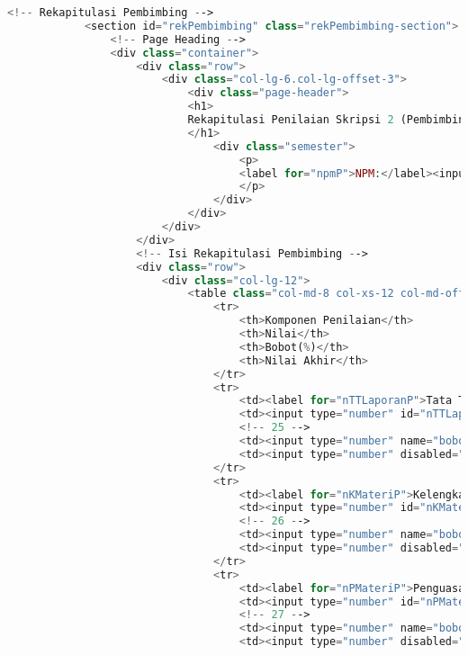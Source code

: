 \begin{lstlisting}[language=PHP,basicstyle=\tiny,caption=skripsi.php]
			<!-- Rekapitulasi Pembimbing -->
			<section id="rekPembimbing" class="rekPembimbing-section">
				<!-- Page Heading -->
				<div class="container">
					<div class="row">
						<div class="col-lg-6.col-lg-offset-3">
							<div class="page-header">
							<h1>
							Rekapitulasi Penilaian Skripsi 2 (Pembimbing)
							</h1>
								<div class="semester">
									<p> 
									<label for="npmP">NPM:</label><input id="nmpP" maxlength="10" value="{{ n_npm}}" disabled="disabled" />
									</p>
								</div>
							</div>
						</div>
					</div>
					<!-- Isi Rekapitulasi Pembimbing -->
					<div class="row">
						<div class="col-lg-12">
							<table class="col-md-8 col-xs-12 col-md-offset-4 col-md-pull-2 table-responsive">
								<tr>
									<th>Komponen Penilaian</th>
									<th>Nilai</th>
									<th>Bobot(%)</th>
									<th>Nilai Akhir</th>
								</tr>
								<tr>
									<td><label for="nTTLaporanP">Tata Tulis Laporan</label></td>
									<td><input type="number" id="nTTLaporanP" max="100" ng-model="nilai_TTLaporanP" class="form-nilai"/></td>
									<!-- 25 -->
									<td><input type="number" name="bobotTataTulisLaporanPembimbing" ng-model="TTLaporanP.value" ng-init="TTLaporanP.value = 20" min="0" max="100" class="form-nilai" readonly="readonly" /></td>
									<td><input type="number" disabled="disabled" value="{{nilai_TTLaporanP * TTLaporanP.value / 100}}" ng-model="total_TTLaporanP" class="form-nilai"/></td>
								</tr>
								<tr>
									<td><label for="nKMateriP">Kelengkapan Materi</label></td>
									<td><input type="number" id="nKMateriP" max="100" ng-model="nilai_KMateriP" class="form-nilai"/></td>
									<!-- 26 -->
									<td><input type="number" name="bobotKelengkapanMateriPembimbing" ng-model="KMateriP.value" ng-init="KMateriP.value = 20" min="0" max="100" class="form-nilai" readonly="readonly" /></td>
									<td><input type="number" disabled="disabled" value="{{nilai_KMateriP * KMateriP.value / 100}}" ng-model="total_KMateriP" class="form-nilai"/></td>
								</tr>
								<tr>
									<td><label for="nPMateriP">Penguasaan Materi</label></td>
									<td><input type="number" id="nPMateriP" max="100" ng-model="nilai_PMateriP" class="form-nilai"/></td>
									<!-- 27 -->
									<td><input type="number" name="bobotPenguasaanMateriPembimbing" ng-model="PMateriP.value" ng-init="PMateriP.value = 30" min="0" max="100" class="form-nilai" readonly="readonly" /></td>
									<td><input type="number" disabled="disabled" value="{{nilai_PMateriP * PMateriP.value / 100}}" ng-model="total_PMateriP" class="form-nilai"/></td>

\end{lstlisting}
